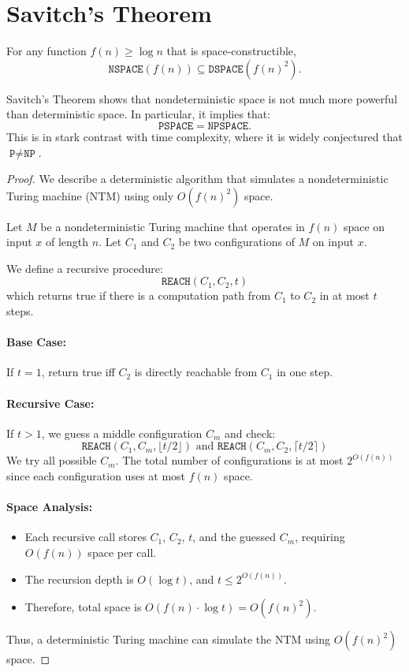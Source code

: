 \section{Savitch's Theorem}

\begin{theorem}
For any function $f(n) \geq \log n$ that is space-constructible,
\[
\texttt{NSPACE}(f(n)) \subseteq \texttt{DSPACE}(f(n)^2).
\]
\end{theorem}

\begin{remark}
Savitch's Theorem shows that nondeterministic space is not much more powerful than deterministic space. In particular, it implies that:
\[
\texttt{PSPACE} = \texttt{NPSPACE}.
\]
This is in stark contrast with time complexity, where it is widely conjectured that $\texttt{P} \ne \texttt{NP}$.
\end{remark}

\begin{proof}
We describe a deterministic algorithm that simulates a nondeterministic Turing machine (NTM) using only $O(f(n)^2)$ space.

Let $M$ be a nondeterministic Turing machine that operates in $f(n)$ space on input $x$ of length $n$. Let $C_1$ and $C_2$ be two configurations of $M$ on input $x$.

We define a recursive procedure:
\[
\texttt{REACH}(C_1, C_2, t)
\]
which returns true if there is a computation path from $C_1$ to $C_2$ in at most $t$ steps.

\paragraph{Base Case:} If $t = 1$, return true iff $C_2$ is directly reachable from $C_1$ in one step.

\paragraph{Recursive Case:} If $t > 1$, we guess a middle configuration $C_m$ and check:
\[
\texttt{REACH}(C_1, C_m, \lfloor t/2 \rfloor) \text{ and } \texttt{REACH}(C_m, C_2, \lceil t/2 \rceil)
\]
We try all possible $C_m$. The total number of configurations is at most $2^{O(f(n))}$ since each configuration uses at most $f(n)$ space.

\paragraph{Space Analysis:}
\begin{itemize}
    \item Each recursive call stores $C_1$, $C_2$, $t$, and the guessed $C_m$, requiring $O(f(n))$ space per call.
    \item The recursion depth is $O(\log t)$, and $t \leq 2^{O(f(n))}$.
    \item Therefore, total space is $O(f(n) \cdot \log t) = O(f(n)^2)$.
\end{itemize}

Thus, a deterministic Turing machine can simulate the NTM using $O(f(n)^2)$ space.
\end{proof}

